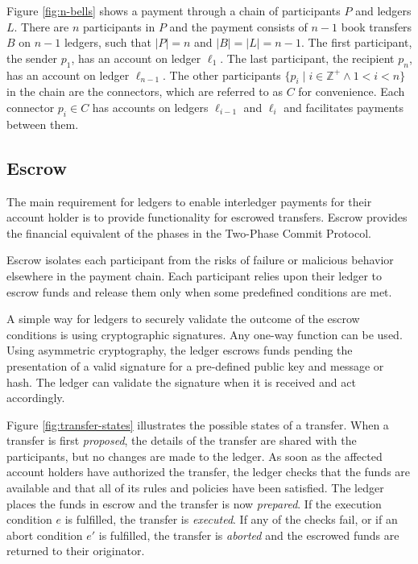 \documentclass[letterpaper,twocolumn,10pt]{article}
\begin{document}
Figure \ref{fig:n-bells} shows a payment through a chain of participants $P$ and ledgers $L$. There are $n$ participants in $P$ and the payment consists of $n-1$ book transfers $B$ on $n-1$ ledgers, such that $ \left\vert{P}\right\vert = n $ and $\left\vert{B}\right\vert = \left\vert{L}\right\vert = n-1 $. The first participant, the sender $p_1$, has an account on ledger $\ell_1$. The last participant, the recipient $p_n$, has an account on ledger $\ell_{n-1}$. The other participants $ \{ p_i \mid i \in \mathbb{Z}^+ \land 1 < i < n \} $ in the chain are the connectors, which are referred to as $C$ for convenience. Each connector $p_i \in C$ has accounts on ledgers $\ell_{i-1}$ and $\ell_i$ and facilitates payments between them.

\subsection{Escrow}

The main requirement for ledgers to enable interledger payments for their account holder is to provide functionality for escrowed transfers. Escrow provides the financial equivalent of the phases in the Two-Phase Commit Protocol. \cite{Gray:1978:NDB:647433.723863}

Escrow isolates each participant from the risks of failure or malicious behavior elsewhere in the payment chain. Each participant relies upon their ledger to escrow funds and release them only when some predefined conditions are met.

A simple way for ledgers to securely validate the outcome of the escrow conditions is using cryptographic signatures. Any one-way function can be used.\cite{rompel1990one} Using asymmetric cryptography, the ledger escrows funds pending the presentation of a valid signature for a pre-defined public key and message or hash. The ledger can validate the signature when it is received and act accordingly.

Figure \ref{fig:transfer-states} illustrates the possible states of a transfer. When a transfer is first \textit{proposed}, the details of the transfer are shared with the participants, but no changes are made to the ledger. As soon as the affected account holders have authorized the transfer, the ledger checks that the funds are available and that all of its rules and policies have been satisfied. The ledger places the funds in escrow and the transfer is now \textit{prepared}. If the execution condition $e$ is fulfilled, the transfer is \textit{executed}. If any of the checks fail, or if an abort condition $e'$ is fulfilled, the transfer is \textit{aborted} and the escrowed funds are returned to their originator.
\end{document}
